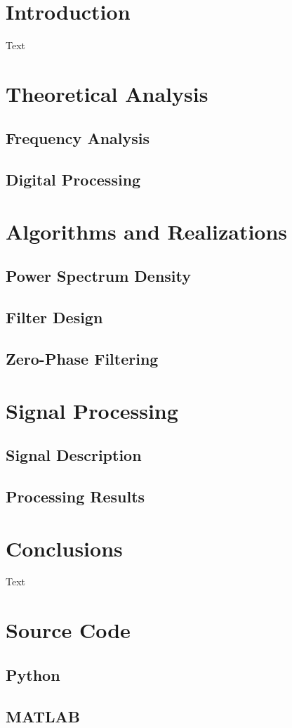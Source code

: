 \section{Introduction}

Text
\section{Theoretical Analysis}

\subsection{Frequency Analysis}

\subsection{Digital Processing}


\section{Algorithms and Realizations}

\subsection{Power Spectrum Density}

\subsection{Filter Design}

\subsection{Zero-Phase Filtering}


\section{Signal Processing}

\subsection{Signal Description}

\subsection{Processing Results}

\section{Conclusions}

Text

\appendix

\section{Source Code}

\subsection{Python}

\subsection{MATLAB}
